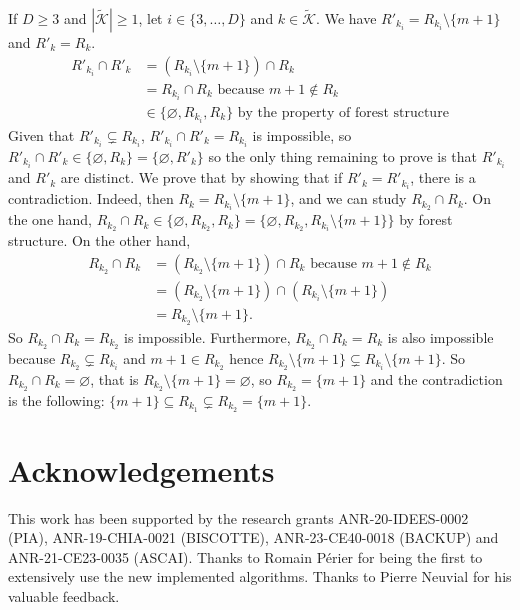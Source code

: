 \documentclass[
  11pt,
  a4paper,
]{article}
\theoremstyle{definition}
\theoremstyle{plain}
\theoremstyle{plain}
\theoremstyle{plain}
\theoremstyle{definition}
\theoremstyle{remark}
\begin{document}
If \(D\geq 3\) and \(|\widetilde{\mathcal{K}}|\geq1\), let
\(i\in\{3,\dotsc, D\}\) and \(k\in\widetilde{\mathcal{K}}\). We have
\(R'_{k_i}=R_{k_i}\setminus\{m+1\}\) and \(R'_k=R_k\). \begin{align*}
R'_{k_i}\cap R'_k&=(R_{k_i}\setminus\{m+1\})\cap R_k \\
&=R_{k_i}\cap R_k \text{ because } m+1\not\in R_k\\
&\in\{\varnothing, R_{k_i}, R_k\} \text{ by the property of forest structure}
\end{align*} Given that \(R'_{k_i}\subsetneq R_{k_i}\),
\(R'_{k_i}\cap R'_k=R_{k_i}\) is impossible, so
\(R'_{k_i}\cap R'_k\in\{\varnothing, R_k\}=\{\varnothing, R'_k\}\) so
the only thing remaining to prove is that \(R'_{k_i}\) and \(R'_k\) are
distinct. We prove that by showing that if \(R'_k = R'_{k_i}\), there is
a contradiction. Indeed, then \(R_k = R_{k_i}\setminus\{m+1\}\), and we
can study \(R_{k_2}\cap R_k\). On the one hand,
\(R_{k_2}\cap R_k\in\{\varnothing, R_{k_2}, R_k\}=\{\varnothing, R_{k_2}, R_{k_i}\setminus\{m+1\}\}\)
by forest structure. On the other hand, \begin{align*}
R_{k_2}\cap R_k&=(R_{k_2}\setminus\{m+1\})\cap R_k \text{ because }m+1\not\in R_k \\
&=(R_{k_2}\setminus\{m+1\})\cap (R_{k_i}\setminus\{m+1\})\\
&=R_{k_2}\setminus\{m+1\}.
\end{align*} So \(R_{k_2}\cap R_k=R_{k_2}\) is impossible. Furthermore,
\(R_{k_2}\cap R_k=R_{k}\) is also impossible because
\(R_{k_2}\subsetneq R_{k_i}\) and \(m+1\in R_{k_2}\) hence
\(R_{k_2}\setminus\{m+1\}\subsetneq R_{k_i}\setminus\{m+1\}\). So
\(R_{k_2}\cap R_k=\varnothing\), that is
\(R_{k_2}\setminus\{m+1\}=\varnothing\), so \(R_{k_2}=\{m+1\}\) and the
contradiction is the following:
\(\{m+1\}\subseteq R_{k_1}\subsetneq R_{k_2}=\{m+1\}\).

\section*{Acknowledgements}\label{acknowledgements}

This work has been supported by the research grants ANR-20-IDEES-0002
(PIA), ANR-19-CHIA-0021 (BISCOTTE), ANR-23-CE40-0018 (BACKUP) and
ANR-21-CE23-0035 (ASCAI). Thanks to Romain Périer for being the first to
extensively use the new implemented algorithms. Thanks to Pierre Neuvial
for his valuable feedback.
\end{document}
